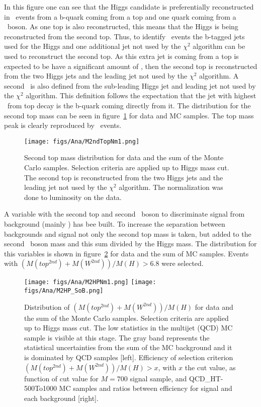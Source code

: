 In this figure one can see that the Higgs candidate is preferentially reconstructed in \ttbar~events from a b-quark coming from a top and one quark coming from a \W~boson. As one top is also reconstructed, this means that the Higgs is being reconstructed from the second top. Thus, to identify \ttbar~events the b-tagged jets used for the Higgs and one additional jet not used by the $\chi^{2}$ algorithm can be used to reconstruct the second top. As this extra jet is coming from a top is expected to be have a significant amount of \pt, then the second top is reconstructed from the two Higgs jets and the leading jet not used by the $\chi^{2}$ algorithm. A second \W~is also defined from the sub-leading Higgs jet and leading jet not used by the $\chi^{2}$ algorithm. This definition follows the expectation that the jet with highest \pt~from top decay is the b-quark coming directly from it. The distribution for the second top mass can be seen in figure~\ref{fig:2ndTM} for data and MC samples. The top mass peak is clearly reproduced by \ttbar~events.

\begin{figure}[!Hhtbp]
  \begin{center}
    \texttt{[image: figs/Ana/M2ndTopNm1.png]}
    \caption{Second top mass distribution for data and the sum of the Monte Carlo samples. Selection criteria are applied up to Higgs mass cut. The second top is reconstructed from the two Higgs jets and the leading jet not used by the $\chi^{2}$ algorithm. The normalization was done to luminosity on the data.}
    \label{fig:2ndTM}
  \end{center}
\end{figure}

A variable with the second top and second \W~boson to discriminate signal from background (mainly \ttbar) has bee built. To increase the separation between backgrounds and signal not only the second top mass is taken, but added to the second \W~boson mass and this sum divided by the Higgs mass. The distribution for this variables is shown in figure~\ref{fig:m2thp} for data and the sum of MC samples. Events with $(M(top^{2nd})+M(W^{2nd}))/M(H)>6.8$ were selected.

\begin{figure}[!Hhtbp]
  \begin{center}
    \texttt{[image: figs/Ana/M2HPNm1.png]}
    \texttt{[image: figs/Ana/M2HP\_SoB.png]}
    \caption{Distribution of $(M(top^{2nd})+M(W^{2nd}))/M(H)$ for data and the sum of the Monte Carlo samples. Selection criteria are applied up to Higgs mass cut. The low statistics in the multijet (QCD) MC sample is visible at this stage. The gray band represents the statistical uncertainties from the sum of the MC background and it is dominated by QCD samples [left]. Efficiency of selection criterion $(M(top^{2nd})+M(W^{2nd}))/M(H)>x$, with $x$ the cut value, as function of cut value for $M=700$ \GeVcc signal sample, \ttbar and QCD\_HT-500To1000 MC samples and ratios between efficiency for signal and each background [right].}
    \label{fig:m2thp}
  \end{center}
\end{figure}

